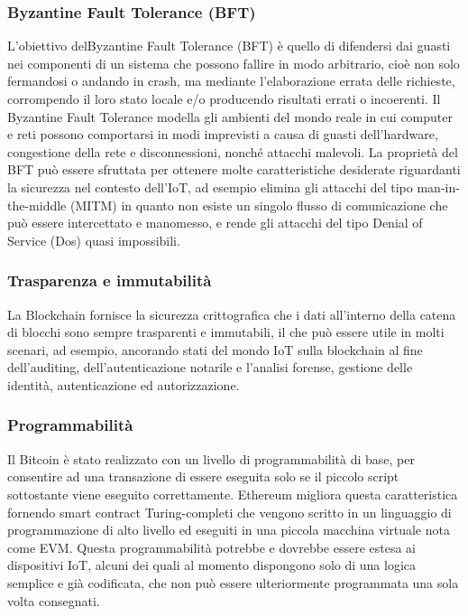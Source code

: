 \subsubsection{Byzantine Fault Tolerance (BFT)}
L'obiettivo delByzantine Fault Tolerance (BFT) è quello di difendersi dai guasti nei componenti
di un sistema che possono fallire in modo arbitrario, cioè non solo fermandosi o andando in crash, ma mediante l'elaborazione errata delle richieste, corrompendo il loro stato locale e/o producendo risultati errati o incoerenti. Il Byzantine Fault Tolerance modella gli ambienti del mondo reale in cui computer e reti possono comportarsi in modi imprevisti a causa di guasti dell'hardware, congestione della rete e disconnessioni, nonché attacchi malevoli. La proprietà del BFT può essere sfruttata per ottenere molte caratteristiche desiderate riguardanti la sicurezza nel contesto dell'IoT, ad esempio elimina gli attacchi del tipo man-in-the-middle (MITM) in quanto non esiste un singolo flusso di comunicazione che può essere intercettato e manomesso, e rende gli attacchi del tipo Denial of Service (Dos) quasi impossibili.

\subsubsection{Trasparenza e immutabilità}
La Blockchain fornisce la sicurezza crittografica che i dati all'interno della catena di blocchi sono sempre trasparenti e immutabili, il che può essere utile in molti scenari, ad esempio, ancorando stati del mondo IoT sulla blockchain al fine dell'auditing, dell'autenticazione notarile e l'analisi forense, gestione delle identità, autenticazione ed autorizzazione.

\subsubsection{Programmabilità}
Il Bitcoin è stato realizzato con un livello di programmabilità di base, per consentire ad una transazione di essere eseguita solo se il piccolo script sottostante viene eseguito correttamente. Ethereum migliora questa caratteristica
fornendo smart contract Turing-completi che vengono scritto in un linguaggio di programmazione di alto livello ed eseguiti in una piccola macchina virtuale nota come EVM. Questa programmabilità potrebbe e dovrebbe essere estesa ai dispositivi IoT, alcuni dei quali al momento dispongono solo di una logica semplice e già codificata, che non può essere ulteriormente programmata una sola volta consegnati.

